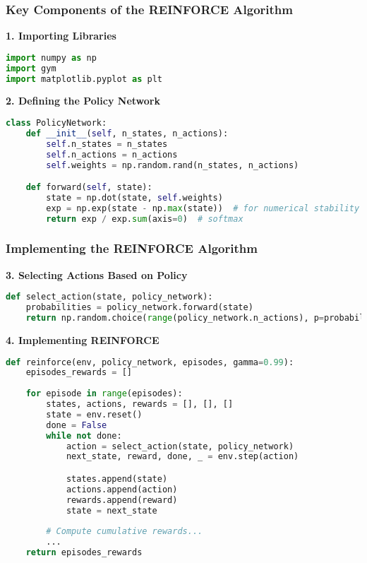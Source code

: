 \documentclass[aspectratio=169]{beamer}
\begin{document}
\begin{frame}[fragile]
    \frametitle{Key Components of the REINFORCE Algorithm}
    \textbf{1. Importing Libraries}
    \begin{lstlisting}[language=python]
import numpy as np
import gym
import matplotlib.pyplot as plt
    \end{lstlisting}

    \textbf{2. Defining the Policy Network}
    \begin{lstlisting}[language=python]
class PolicyNetwork:
    def __init__(self, n_states, n_actions):
        self.n_states = n_states
        self.n_actions = n_actions
        self.weights = np.random.rand(n_states, n_actions)

    def forward(self, state):
        state = np.dot(state, self.weights)
        exp = np.exp(state - np.max(state))  # for numerical stability
        return exp / exp.sum(axis=0)  # softmax
    \end{lstlisting}
\end{frame}

\begin{frame}[fragile]
    \frametitle{Implementing the REINFORCE Algorithm}
    \textbf{3. Selecting Actions Based on Policy}
    \begin{lstlisting}[language=python]
def select_action(state, policy_network):
    probabilities = policy_network.forward(state)
    return np.random.choice(range(policy_network.n_actions), p=probabilities)
    \end{lstlisting}

    \textbf{4. Implementing REINFORCE}
    \begin{lstlisting}[language=python]
def reinforce(env, policy_network, episodes, gamma=0.99):
    episodes_rewards = []
    
    for episode in range(episodes):
        states, actions, rewards = [], [], []
        state = env.reset()
        done = False
        while not done:
            action = select_action(state, policy_network)
            next_state, reward, done, _ = env.step(action)

            states.append(state)
            actions.append(action)
            rewards.append(reward)
            state = next_state
            
        # Compute cumulative rewards...
        ...
    return episodes_rewards
    \end{lstlisting}
\end{frame}
\end{document}
